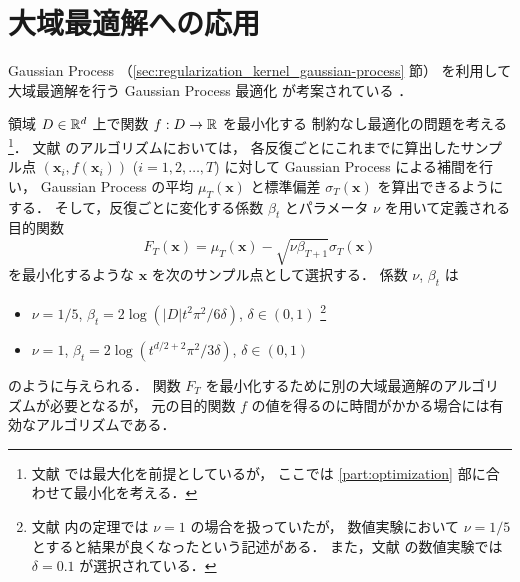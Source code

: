 \section{大域最適解への応用}

Gaussian Process （\ref{sec:regularization_kernel_gaussian-process} 節）
を利用して大域最適解を行う
Gaussian Process 最適化
が考案されている
\cite{Srinivas2010}．

領域 $D \in \mathbb{R}^d$ 上で関数 $f : D \to \mathbb{R}$ を最小化する
制約なし最適化の問題を考える
\footnote{文献 \cite{Srinivas2010} では最大化を前提としているが，%
    ここでは \ref{part:optimization} 部に合わせて最小化を考える．}．
文献 \cite{Srinivas2010} のアルゴリズムにおいては，
各反復ごとにこれまでに算出したサンプル点
$(\bm{x}_i, f(\bm{x}_i))$ ($i = 1,2,\ldots,T$)
に対して Gaussian Process による補間を行い，
Gaussian Process の平均 $\mu_T(\bm{x})$ と標準偏差 $\sigma_T(\bm{x})$ を算出できるようにする．
そして，反復ごとに変化する係数 $\beta_t$ とパラメータ $\nu$ を用いて定義される目的関数
\begin{equation}
    F_T(\bm{x}) = \mu_T(\bm{x}) - \sqrt{\nu \beta_{T+1}} \sigma_T(\bm{x})
\end{equation}
を最小化するような $\bm{x}$ を次のサンプル点として選択する．
係数 $\nu$, $\beta_t$ は
\begin{itemize}
    \item $\nu = 1/5$, $\beta_t = 2 \log(|D| t^2 \pi^2 / 6 \delta)$,
          $\delta \in (0, 1)$
          \cite{Srinivas2010}
          \footnote{文献 \cite{Srinivas2010} 内の定理では $\nu = 1$ の場合を扱っていたが，%
              数値実験において $\nu = 1/5$ とすると結果が良くなったという記述がある．%
              また，文献 \cite{Srinivas2010} の数値実験では $\delta = 0.1$ が選択されている．}
    \item $\nu=1$, $\beta_t = 2 \log(t^{d/2+2} \pi^2 /3 \delta)$,
          $\delta \in (0, 1)$
          \cite{Brochu2010}
\end{itemize}
のように与えられる．
関数 $F_T$ を最小化するために別の大域最適解のアルゴリズムが必要となるが，
元の目的関数 $f$ の値を得るのに時間がかかる場合には有効なアルゴリズムである．
